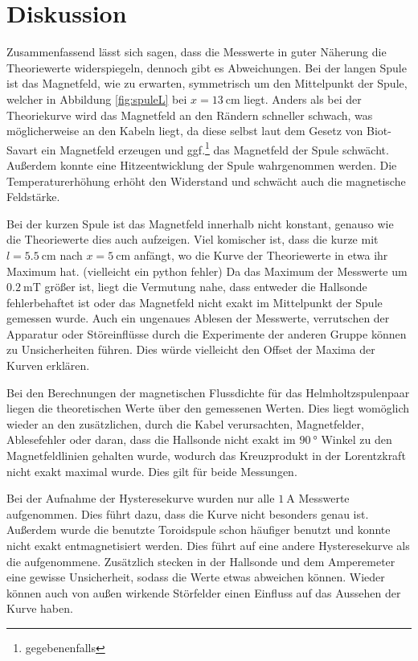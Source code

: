 \section{Diskussion}
\label{sec:Diskussion}
Zusammenfassend lässt sich sagen, dass die Messwerte in guter Näherung die
Theoriewerte widerspiegeln, dennoch gibt es Abweichungen.
Bei der langen Spule ist das Magnetfeld, wie zu erwarten, symmetrisch um den
Mittelpunkt der Spule, welcher in Abbildung \ref{fig:spuleL} bei
$x = \SI{13}{\centi\meter}$ liegt. Anders als bei der Theoriekurve wird das
Magnetfeld an den Rändern schneller schwach, was möglicherweise an den Kabeln
liegt, da diese selbst laut dem Gesetz von Biot-Savart ein Magnetfeld erzeugen
und ggf.\footnote{gegebenenfalls} das Magnetfeld der Spule schwächt. Außerdem
konnte eine Hitzeentwicklung der Spule wahrgenommen werden. Die
Temperaturerhöhung erhöht den Widerstand und schwächt auch die magnetische
Feldstärke.

Bei der kurzen Spule ist das Magnetfeld innerhalb nicht konstant, genauso wie
die Theoriewerte dies auch aufzeigen. Viel komischer ist, dass die kurze mit
$l = \SI{5.5}{\centi\meter}$ nach $x = \SI{5}{\centi\meter}$ anfängt, wo die
Kurve der Theoriewerte in etwa ihr Maximum hat. (vielleicht ein python fehler)
Da das Maximum der Messwerte um $\SI{0.2}{\milli\tesla}$ größer ist,
liegt die Vermutung nahe, dass entweder die Hallsonde fehlerbehaftet ist oder
das Magnetfeld nicht exakt im Mittelpunkt der Spule gemessen wurde. Auch ein
ungenaues Ablesen der Messwerte, verrutschen der Apparatur oder Störeinflüsse
durch die Experimente der anderen Gruppe können zu Unsicherheiten führen.
Dies würde vielleicht den Offset der Maxima der Kurven erklären.

Bei den Berechnungen der magnetischen Flussdichte für das Helmholtzspulenpaar
liegen die theoretischen Werte über den gemessenen Werten. Dies liegt womöglich
wieder an den zusätzlichen, durch die Kabel verursachten, Magnetfelder,
Ablesefehler oder daran, dass die Hallsonde nicht exakt im $\SI{90}{\degree}$
Winkel zu den Magnetfeldlinien gehalten wurde, wodurch das Kreuzprodukt in
der Lorentzkraft nicht exakt maximal wurde. Dies gilt für beide Messungen.

Bei der Aufnahme der Hysteresekurve wurden nur alle $\SI{1}{\ampere}$
Messwerte aufgenommen. Dies führt dazu, dass die Kurve nicht besonders genau ist.
Außerdem wurde die benutzte Toroidspule schon häufiger benutzt und konnte
nicht exakt entmagnetisiert werden. Dies führt auf eine andere Hysteresekurve
als die aufgenommene. Zusätzlich stecken in der Hallsonde und dem Amperemeter
eine gewisse Unsicherheit, sodass die Werte etwas abweichen können. Wieder können
auch von außen wirkende Störfelder einen Einfluss auf das Aussehen der Kurve
haben.

